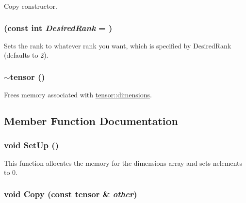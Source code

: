 Copy constructor. \hypertarget{classJKBuilder_1_1tensor_aceb793f098521f84a758cc6f5ff8a997}{
\subsubsection[{tensor}]{ (const int {\em DesiredRank} = {})}}
\label{classJKBuilder_1_1tensor_aceb793f098521f84a758cc6f5ff8a997}


Sets the rank to whatever rank you want, which is specified by DesiredRank (defaults to 2). \hypertarget{classJKBuilder_1_1tensor_ac8c25ac32c0d7ab75d3764e014b05997}{
\subsubsection[{$\sim$tensor}]{\setlength{\rightskip}{0pt plus 5cm}$\sim${\bf tensor} ()}}
\label{classJKBuilder_1_1tensor_ac8c25ac32c0d7ab75d3764e014b05997}


Frees memory associated with \hyperlink{classJKBuilder_1_1tensor_a2ce1e6e0782ddee097f2c4aa2663d3e9}{tensor::dimensions}. 

\subsection{Member Function Documentation}
\hypertarget{classJKBuilder_1_1tensor_a1b06560e0e01a806b92c2386220d0b57}{
\subsubsection[{SetUp}]{\setlength{\rightskip}{0pt plus 5cm}void SetUp ()}}
\label{classJKBuilder_1_1tensor_a1b06560e0e01a806b92c2386220d0b57}


This function allocates the memory for the dimensions array and sets nelements to 0. \hypertarget{classJKBuilder_1_1tensor_a60e1f7417550ba45971b688cc168d34f}{
\subsubsection[{Copy}]{\setlength{\rightskip}{0pt plus 5cm}void Copy (const {\bf tensor} \& {\em other})}}
\label{classJKBuilder_1_1tensor_a60e1f7417550ba45971b688cc168d34f}


